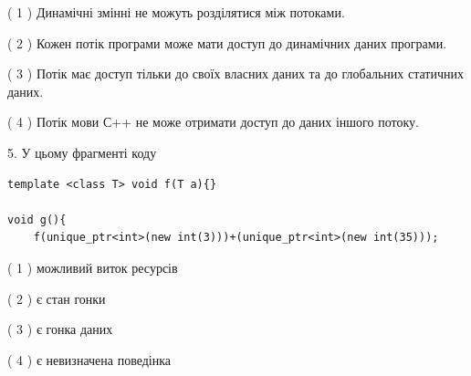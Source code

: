 \documentclass[12pt, ukrainian]{article}
\begin{document}
\begin {large}
{( 1 ) Динамічні змінні не можуть розділятися між потоками.%

( 2 ) Кожен потік програми може мати доступ до динамічних даних програми.%

( 3 ) Потік має доступ тільки до своїх власних даних та до глобальних статичних даних.%

( 4 ) Потік мови С++ не може отримати доступ до даних іншого потоку.%


5. У цьому фрагменті коду
\begin{verbatim}
template <class T> void f(T a){}

void g(){
    f(unique_ptr<int>(new int(3)))+(unique_ptr<int>(new int(35)));
\end{verbatim}

( 1 ) можливий виток ресурсів%

( 2 ) є стан гонки%

( 3 ) є гонка даних%

( 4 ) є невизначена поведінка%
}
\end {large}
\end{document}
